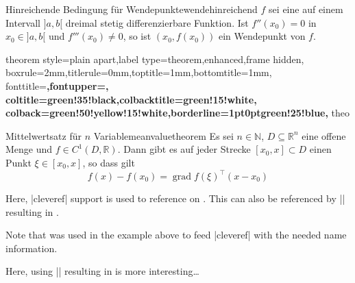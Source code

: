 \begin{dispExample}
\begin{Theorem}[boxrule=2mm,toptitle=-1.5mm,bottomtitle=-1.5mm]{%
    Hinreichende Bedingung f\"{u}r Wendepunkte}{wendehinreichend}%
  $f$ sei eine auf einem Intervall $]a,b[$ dreimal stetig differenzierbare Funktion.
  Ist $f''(x_0)=0$ in $x_0\in]a,b[$ und $f'''(x_0)\ne 0$, so ist
  $(x_0,f(x_0))$ ein Wendepunkt von $f$.
\end{Theorem}
\end{dispExample}

\begin{dispExample}
%
  {theorem style=plain apart,label type=theorem,enhanced,frame hidden,
  boxrule=2mm,titlerule=0mm,toptitle=1mm,bottomtitle=1mm,
  fonttitle=\bfseries\large,fontupper=\normalsize,
  coltitle=green!35!black,colbacktitle=green!15!white,
  colback=green!50!yellow!15!white,borderline={1pt}{0pt}{green!25!blue},
  }{theo}

\begin{YetAnotherTheorem}{Mittelwertsatz f\"{u}r $n$ Variable}{meanvaluetheorem}%
  Es sei $n\in\mathbb{N}$, $D\subseteq\mathbb{R}^n$ eine offene Menge und
  $f\in C^{1}(D,\mathbb{R})$. Dann gibt es auf jeder Strecke
  $[x_0,x]\subset D$ einen Punkt $\xi\in[x_0,x]$, so dass gilt
  \begin{equation*}
  f(x)-f(x_0) = \operatorname{grad} f(\xi)^{\top}(x-x_0)
  \end{equation*}
\end{YetAnotherTheorem}

\medskip
Here, |cleveref| support is used to reference 
on . This 
can also be referenced by |\Vref| resulting in .
\end{dispExample}

\begin{marker}
Note that  was used in the example above to feed
|cleveref| \cite{cubitt:2018a} with the needed name information.
\end{marker}

\clearpage

\begin{dispExample}
Here, using |\Vref| resulting in  is more interesting\ldots
\end{dispExample}


